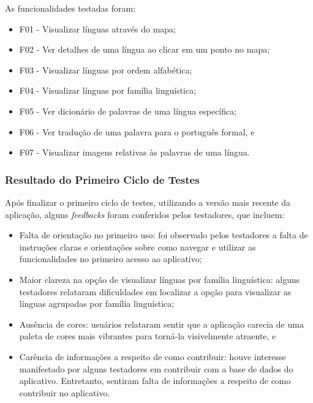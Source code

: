\begin{description}
    \item As funcionalidades testadas foram:
	\begin{itemize}
		\item F01 - Visualizar línguas através do mapa;
		\item F02 - Ver detalhes de uma língua ao clicar em um ponto no mapa;
		\item F03 - Visualizar línguas por ordem alfabética;
		\item F04 - Visualizar línguas por família linguística;
		\item F05 - Ver dicionário de palavras de uma língua específica;
		\item F06 - Ver tradução de uma palavra para o português formal, e
		\item F07 - Visualizar imagens relativas às palavras de uma língua.
	\end{itemize}
\end{description}

\subsubsection{Resultado do Primeiro Ciclo de Testes}
\label{sec:Resultado do Primeiro Ciclo de Testes}
Após finalizar o primeiro ciclo de testes, utilizando a versão mais recente da aplicação, alguns \textit{feedbacks} foram conferidos pelos testadores, que incluem:

\begin{itemize}
	\item Falta de orientação no primeiro uso: foi observado pelos testadores a falta de instruções claras e orientações sobre como navegar e utilizar as funcionalidades no primeiro acesso ao aplicativo;
	\item Maior clareza na opção de visualizar línguas por família linguística: alguns testadores relataram dificuldades em localizar a opção para visualizar as línguas agrupadas por família linguística;
	\item Ausência de cores: usuários relataram sentir que a aplicação carecia de uma paleta de cores mais vibrantes para torná-la visivelmente atraente, e
	\item Carência de informações a respeito de como contribuir: houve interesse manifestado por alguns testadores em contribuir com a base de dados do aplicativo. Entretanto, sentiram falta de informações a respeito 
	de como contribuir no aplicativo.
\end{itemize}

